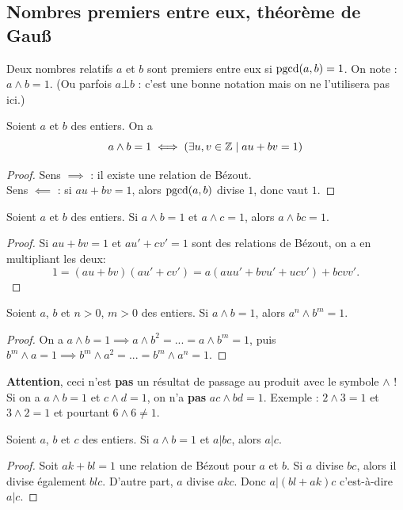 \subsection{Nombres premiers entre eux, théorème de Gau{\ss}}

\begin{definition}
Deux nombres relatifs $a$ et $b$ sont premiers entre eux si $\operatorname{pgcd}(a,b)=1$. On note :  $a\wedge b = 1$. (Ou parfois $a\bot b$ : c'est une bonne notation mais on ne l'utilisera pas ici.)
\end{definition}

\begin{proposition} Soient $a$ et $b$ des entiers. On a 
\[
a\wedge b = 1 \iff \left(\exists u, v\in \Z\mid au+bv=1\right)
\]
\end{proposition}
\begin{proof}
Sens $\implies$ : il existe une relation de Bézout.\\
Sens $\impliedby$ : si $au+bv=1$, alors  $\operatorname{pgcd}(a,b)$ divise $1$, donc vaut $1$.
\end{proof}

\begin{proposition}
Soient $a$ et $b$ des entiers.
Si $a\wedge b = 1$ et $a\wedge c = 1$, alors $a\wedge bc=1$.
\end{proposition}
\begin{proof}
Si $au+bv=1$ et $au'+cv'=1$ sont des relations de Bézout, on a en multipliant les deux:
\[ 1 = (au+bv)(au'+cv') = a(auu'+bvu'+ucv')+bcvv'.\]
\end{proof}
\begin{corollaire}
Soient $a$, $b$ et $n>0$, $m>0$ des entiers.
Si $a\wedge b = 1$, alors $a^n\wedge b^m=1$.
\end{corollaire}
\begin{proof}
On a $a\wedge b = 1 \implies a\wedge b^2= ... =  a\wedge b^m=1$, puis $b^m\wedge a=1  \implies b^m\wedge a^2 = ... = b^m\wedge a^n=1$.
\end{proof}

\textbf{Attention}, ceci n'est \textbf{pas} un résultat de passage au produit avec le symbole $\wedge$ ! Si on a $a\wedge b = 1$ et $c\wedge d = 1$, on n'a \textbf{pas} $ac\wedge bd=1$. Exemple  : $2\wedge 3=1$ et $3\wedge 2=1$ et pourtant $6\wedge 6\neq 1$.

\begin{theoreme}
Soient $a$, $b$ et $c$ des entiers.
Si $a\wedge b = 1$ et $a|bc$, alors $a|c$.
\end{theoreme}
\begin{proof}
Soit $ak+bl=1$ une relation de Bézout pour $a$ et $b$.
Si $a$ divise $bc$, alors il divise également $blc$. D'autre part, $a$ divise $akc$. Donc $a | (bl+ak)c$ c'est-à-dire $a|c$.
\end{proof}

